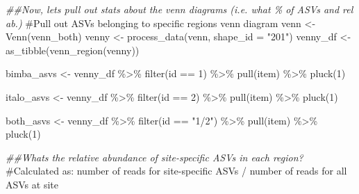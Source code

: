 \documentclass[
  letterpaper,
  DIV=11,
  numbers=noendperiod]{scrartcl}
\newenvironment{Shaded}{\begin{snugshade}}{\end{snugshade}}
\newcommand{\AttributeTok}[1]{\textcolor[rgb]{0.40,0.45,0.13}{#1}}
\newcommand{\CommentTok}[1]{\textcolor[rgb]{0.37,0.37,0.37}{#1}}
\newcommand{\DecValTok}[1]{\textcolor[rgb]{0.68,0.00,0.00}{#1}}
\newcommand{\DocumentationTok}[1]{\textcolor[rgb]{0.37,0.37,0.37}{\textit{#1}}}
\newcommand{\FunctionTok}[1]{\textcolor[rgb]{0.28,0.35,0.67}{#1}}
\newcommand{\NormalTok}[1]{\textcolor[rgb]{0.00,0.23,0.31}{#1}}
\newcommand{\OtherTok}[1]{\textcolor[rgb]{0.00,0.23,0.31}{#1}}
\newcommand{\SpecialCharTok}[1]{\textcolor[rgb]{0.37,0.37,0.37}{#1}}
\newcommand{\StringTok}[1]{\textcolor[rgb]{0.13,0.47,0.30}{#1}}
\begin{document}
\begin{Shaded}
\begin{Highlighting}[]
\DocumentationTok{\#\#Now, let\textquotesingle{}s pull out stats about the venn diagrams (i.e. what \% of ASVs and rel ab.)}
\CommentTok{\#Pull out ASVs belonging to specific regions venn diagram}
\NormalTok{venn }\OtherTok{\textless{}{-}} \FunctionTok{Venn}\NormalTok{(venn\_both)}
\NormalTok{venny }\OtherTok{\textless{}{-}} \FunctionTok{process\_data}\NormalTok{(venn, }\AttributeTok{shape\_id =} \StringTok{"201"}\NormalTok{)}
\NormalTok{venny\_df }\OtherTok{\textless{}{-}} \FunctionTok{as\_tibble}\NormalTok{(}\FunctionTok{venn\_region}\NormalTok{(venny))}

\NormalTok{bimba\_asvs }\OtherTok{\textless{}{-}}\NormalTok{ venny\_df }\SpecialCharTok{\%\textgreater{}\%}
  \FunctionTok{filter}\NormalTok{(id }\SpecialCharTok{==} \DecValTok{1}\NormalTok{) }\SpecialCharTok{\%\textgreater{}\%}
  \FunctionTok{pull}\NormalTok{(item) }\SpecialCharTok{\%\textgreater{}\%}
  \FunctionTok{pluck}\NormalTok{(}\DecValTok{1}\NormalTok{)}

\NormalTok{italo\_asvs }\OtherTok{\textless{}{-}}\NormalTok{ venny\_df }\SpecialCharTok{\%\textgreater{}\%}
  \FunctionTok{filter}\NormalTok{(id }\SpecialCharTok{==} \DecValTok{2}\NormalTok{) }\SpecialCharTok{\%\textgreater{}\%}
  \FunctionTok{pull}\NormalTok{(item) }\SpecialCharTok{\%\textgreater{}\%}
  \FunctionTok{pluck}\NormalTok{(}\DecValTok{1}\NormalTok{)}

\NormalTok{both\_asvs }\OtherTok{\textless{}{-}}\NormalTok{ venny\_df }\SpecialCharTok{\%\textgreater{}\%}
  \FunctionTok{filter}\NormalTok{(id }\SpecialCharTok{==} \StringTok{"1/2"}\NormalTok{) }\SpecialCharTok{\%\textgreater{}\%}
  \FunctionTok{pull}\NormalTok{(item) }\SpecialCharTok{\%\textgreater{}\%}
  \FunctionTok{pluck}\NormalTok{(}\DecValTok{1}\NormalTok{)}

\DocumentationTok{\#\#What\textquotesingle{}s the relative abundance of site{-}specific ASVs in each region?}
\CommentTok{\#Calculated as: number of reads for site{-}specific ASVs / number of reads for all ASVs at site}


\end{Highlighting}
\end{Shaded}
\end{document}
